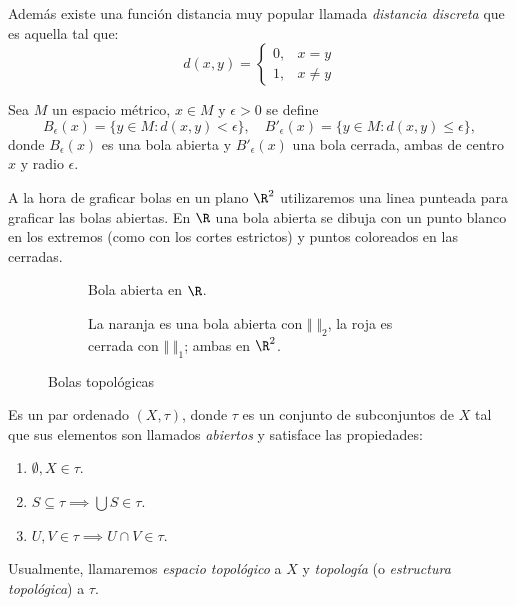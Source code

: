 \documentclass[11pt,oneside,a4paper]{book}
\begin{document}
Además existe una función distancia muy popular llamada \textit{distancia discreta} que es aquella tal que:
$$d(x,y)=\begin{cases}
0, &x=y\\
1, &x\neq y
\end{cases}$$
\begin{mydef}[Bolas]
Sea $M$ un espacio métrico, $x\in M$ y $\epsilon\gt 0$ se define
$$B_\epsilon(x)=\{y\in M:d(x,y)\lt\epsilon\},\quad B'_\epsilon(x)=\{y\in M:d(x,y)\leq\epsilon\},$$
donde $B_\epsilon(x)$ es una bola abierta y $B'_\epsilon(x)$ una bola cerrada, ambas de centro $x$ y radio $\epsilon$.
\end{mydef}
A la hora de graficar bolas en un plano $\R^2$ utilizaremos una linea punteada para graficar las bolas abiertas. En $\R$ una bola abierta se dibuja con un punto blanco en los extremos (como con los cortes estrictos) y puntos coloreados en las cerradas.
\begin{figure}
\centering
\begin{subfigure}{.55\textwidth}
\centering
{}
\caption{Bola abierta en $\R$.}
\end{subfigure}
\begin{subfigure}{.4\textwidth}
\centering
{}
\caption{La naranja es una bola abierta con $\Vert\;\Vert_2$, la roja es cerrada con $\Vert\;\Vert_1$; ambas en $\R^2$.}
\end{subfigure}
\caption{Bolas topológicas}
\end{figure}
\begin{mydef}
Es un par ordenado $(X,\tau)$, donde $\tau$ es un conjunto de subconjuntos de $X$ tal que sus elementos son llamados \textit{abiertos} y satisface las propiedades:
\begin{enumerate}[(1)]
\item $\emptyset,X\in\tau$.
\item $S\subseteq\tau\implies \bigcup S\in\tau$.
\item $U,V\in\tau\implies U\cap V\in\tau$.
\end{enumerate}
Usualmente, llamaremos \textit{espacio topológico} a $X$ y \textit{topología} (o \textit{estructura topológica}) a $\tau$.
\end{mydef}
\end{document}
